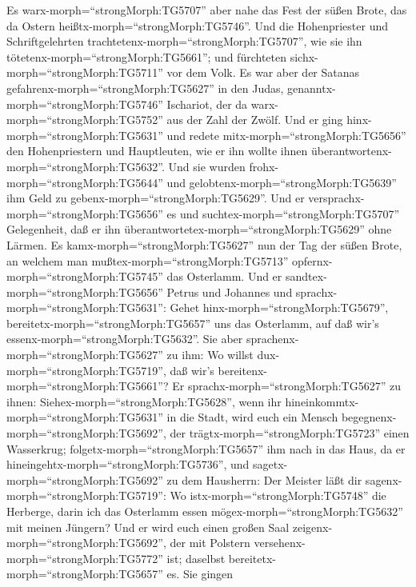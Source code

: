  Es warx-morph=``strongMorph:TG5707'' aber nahe das Fest der
süßen Brote, das da Ostern heißtx-morph=``strongMorph:TG5746''.
 Und die Hohenpriester und Schriftgelehrten
trachtetenx-morph=``strongMorph:TG5707'', wie sie ihn
tötetenx-morph=``strongMorph:TG5661''; und fürchteten
sichx-morph=``strongMorph:TG5711'' vor dem Volk.  Es war
aber der Satanas gefahrenx-morph=``strongMorph:TG5627'' in den Judas,
genanntx-morph=``strongMorph:TG5746'' Ischariot, der da
warx-morph=``strongMorph:TG5752'' aus der Zahl der Zwölf. 
Und er ging hinx-morph=``strongMorph:TG5631'' und redete
mitx-morph=``strongMorph:TG5656'' den Hohenpriestern und Hauptleuten,
wie er ihn wollte ihnen überantwortenx-morph=``strongMorph:TG5632''.
 Und sie wurden frohx-morph=``strongMorph:TG5644'' und
gelobtenx-morph=``strongMorph:TG5639'' ihm Geld zu
gebenx-morph=``strongMorph:TG5629''.  Und er
versprachx-morph=``strongMorph:TG5656'' es und
suchtex-morph=``strongMorph:TG5707'' Gelegenheit, daß er ihn
überantwortetex-morph=``strongMorph:TG5629'' ohne Lärmen. 
Es kamx-morph=``strongMorph:TG5627'' nun der Tag der süßen Brote, an
welchem man mußtex-morph=``strongMorph:TG5713''
opfernx-morph=``strongMorph:TG5745'' das Osterlamm.  Und er
sandtex-morph=``strongMorph:TG5656'' Petrus und Johannes und
sprachx-morph=``strongMorph:TG5631'': Gehet
hinx-morph=``strongMorph:TG5679'',
bereitetx-morph=``strongMorph:TG5657'' uns das Osterlamm, auf daß wir's
essenx-morph=``strongMorph:TG5632''.  Sie aber
sprachenx-morph=``strongMorph:TG5627'' zu ihm: Wo willst
dux-morph=``strongMorph:TG5719'', daß wir's
bereitenx-morph=``strongMorph:TG5661''?  Er
sprachx-morph=``strongMorph:TG5627'' zu ihnen:
Siehex-morph=``strongMorph:TG5628'', wenn ihr
hineinkommtx-morph=``strongMorph:TG5631'' in die Stadt, wird euch ein
Mensch begegnenx-morph=``strongMorph:TG5692'', der
trägtx-morph=``strongMorph:TG5723'' einen Wasserkrug;
folgetx-morph=``strongMorph:TG5657'' ihm nach in das Haus, da er
hineingehtx-morph=``strongMorph:TG5736'',  und
sagetx-morph=``strongMorph:TG5692'' zu dem Hausherrn: Der Meister läßt
dir sagenx-morph=``strongMorph:TG5719'': Wo
istx-morph=``strongMorph:TG5748'' die Herberge, darin ich das Osterlamm
essen mögex-morph=``strongMorph:TG5632'' mit meinen Jüngern?
 Und er wird euch einen großen Saal
zeigenx-morph=``strongMorph:TG5692'', der mit Polstern
versehenx-morph=``strongMorph:TG5772'' ist; daselbst
bereitetx-morph=``strongMorph:TG5657'' es.  Sie gingen
